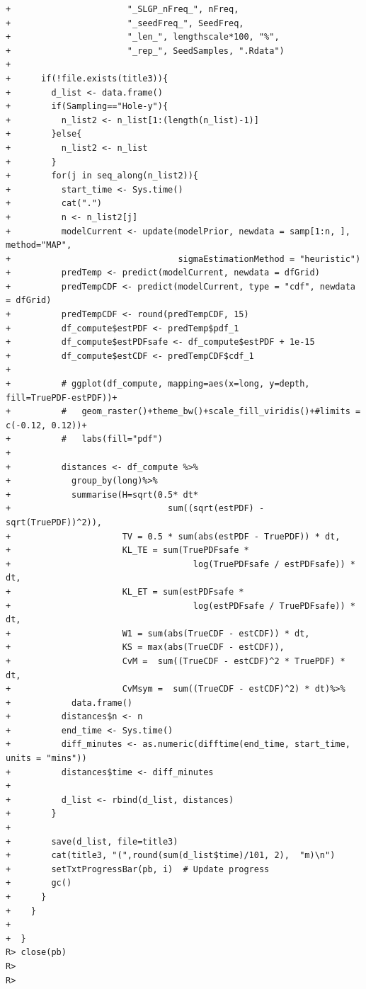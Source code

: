 \documentclass[
]{article}
\begin{document}
\begin{verbatim}
+                       "_SLGP_nFreq_", nFreq,
+                       "_seedFreq_", SeedFreq, 
+                       "_len_", lengthscale*100, "%",
+                       "_rep_", SeedSamples, ".Rdata")
+      
+      if(!file.exists(title3)){
+        d_list <- data.frame()
+        if(Sampling=="Hole-y"){
+          n_list2 <- n_list[1:(length(n_list)-1)]
+        }else{
+          n_list2 <- n_list
+        }
+        for(j in seq_along(n_list2)){
+          start_time <- Sys.time()
+          cat(".")
+          n <- n_list2[j]
+          modelCurrent <- update(modelPrior, newdata = samp[1:n, ], method="MAP",
+                                 sigmaEstimationMethod = "heuristic")
+          predTemp <- predict(modelCurrent, newdata = dfGrid)
+          predTempCDF <- predict(modelCurrent, type = "cdf", newdata = dfGrid)
+          predTempCDF <- round(predTempCDF, 15)
+          df_compute$estPDF <- predTemp$pdf_1
+          df_compute$estPDFsafe <- df_compute$estPDF + 1e-15
+          df_compute$estCDF <- predTempCDF$cdf_1
+          
+          # ggplot(df_compute, mapping=aes(x=long, y=depth, fill=TruePDF-estPDF))+
+          #   geom_raster()+theme_bw()+scale_fill_viridis()+#limits = c(-0.12, 0.12))+        
+          #   labs(fill="pdf")
+          
+          distances <- df_compute %>%
+            group_by(long)%>%
+            summarise(H=sqrt(0.5* dt*
+                               sum((sqrt(estPDF) - sqrt(TruePDF))^2)),
+                      TV = 0.5 * sum(abs(estPDF - TruePDF)) * dt,
+                      KL_TE = sum(TruePDFsafe * 
+                                    log(TruePDFsafe / estPDFsafe)) * dt,
+                      KL_ET = sum(estPDFsafe * 
+                                    log(estPDFsafe / TruePDFsafe)) * dt,
+                      W1 = sum(abs(TrueCDF - estCDF)) * dt,
+                      KS = max(abs(TrueCDF - estCDF)),
+                      CvM =  sum((TrueCDF - estCDF)^2 * TruePDF) * dt,
+                      CvMsym =  sum((TrueCDF - estCDF)^2) * dt)%>%
+            data.frame()
+          distances$n <- n
+          end_time <- Sys.time()
+          diff_minutes <- as.numeric(difftime(end_time, start_time, units = "mins"))
+          distances$time <- diff_minutes 
+          
+          d_list <- rbind(d_list, distances)
+        }
+        
+        save(d_list, file=title3)
+        cat(title3, "(",round(sum(d_list$time)/101, 2),  "m)\n")
+        setTxtProgressBar(pb, i)  # Update progress
+        gc()
+      }
+    }
+    
+  }
R> close(pb)
R> 
R> 
\end{verbatim}
\end{document}
